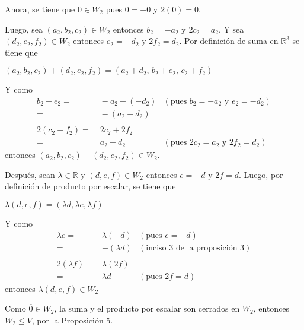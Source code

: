 \documentclass[fleqn]{article}
\begin{document}
\begin{enumerate}
\begin{enumerate}
            Ahora, se tiene que $ \overline{0} \in W_2 $ pues $ 0 = -0 $ y $ 2(0) = 0 $.

            Luego, sea $ (a_2,b_2,c_2) \in W_2 $ entonces $ b_2 = -a_2 $ y $ 2c_2 = a_2 $. Y sea $ (d_2,e_2,f_2) \in W_2 $ entonces $ e_2 = -d_2 $ y $ 2f_2 = d_2 $. Por definición de suma en $ \mathbb{R}^3 $ se tiene que \par

            $ (a_2,b_2,c_2) + (d_2,e_2,f_2) = (a_2 + d_2, \, b_2 + e_2, \, c_2 + f_2) $ \par

            Y como
            \begin{align*}
                b_2 + e_2 =& \; -a_2 + (-d_2) &(\text{pues } b_2 = -a_2 \text{ y } e_2 = -d_2) \\
                =& \; -(a_2 + d_2) \\\\
                2(c_2 + f_2) =& \; 2c_2 + 2f_2 \\
                =& \; a_2 + d_2 &(\text{pues } 2c_2 = a_2 \text{ y } 2f_2 = d_2)
            \end{align*}
            entonces $ (a_2,b_2,c_2) + (d_2,e_2,f_2) \in W_2 $. \par

            Después, sean $ \lambda \in \mathbb{R} $ y $ (d,e,f) \in W_2 $ entonces $ e = -d $ y $ 2f = d $. Luego, por definición de producto por escalar, se tiene que \par

            $ \lambda (d,e,f) = (\lambda d, \lambda e, \lambda f) $ \par

            Y como
            \begin{align*}
                \lambda e =& \lambda (-d)  &(\text{pues } e = -d) \\
                =& - (\lambda d) &(\text{inciso 3 de la proposición 3}) \\\\
                2 (\lambda f) =& \lambda (2f) \\
                =& \lambda d &(\text{pues } 2f = d) 
            \end{align*}
            entonces $ \lambda (d,e,f) \in W_2 $ \par

            Como $ \overline{0} \in W_2 $, la suma y el producto por escalar son cerrados en $ W_2 $, entonces $ W_2 \leq V $, por la Proposición 5. \par


\end{enumerate}
\end{enumerate}
\end{document}
